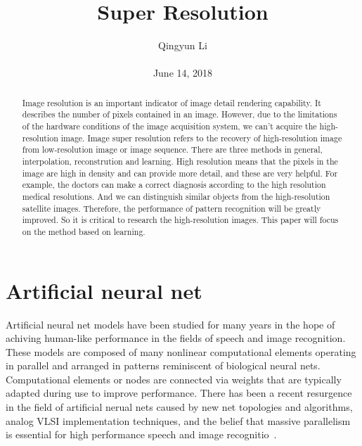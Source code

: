 \documentclass[10pt,twocolumn,letterpaper]{article}
\begin{document}
\author{Qingyun Li\\\\
June 14, 2018}        
\title{Super Resolution}

\maketitle

\begin{abstract}
 \par
  Image resolution is an important indicator of image detail rendering capability. It describes the number of pixels contained in an image. However, due to the limitations of the hardware conditions of the image acquisition system, we can't acquire the high-resolution image. Image super resolution refers to the recovery of high-resolution image from low-resolution image or image sequence. There are three methods in general, interpolation, reconstrution and learning.  High resolution means that the pixels in the image are high in density and can provide more detail, and these are very helpful. For example, the doctors can make a correct diagnosis according to the high resolution medical resolutions. And we can distinguish similar objects from the high-resolution satellite images. Therefore, the performance of pattern recognition will be greatly improved. So it is critical to research the high-resolution images. This paper will focus on the method based on learning.
\end{abstract}
\section{Artificial neural net}
 \par Artificial neural net models have been studied for many years in the hope of achiving human-like performance in the fields of speech and image recognition. These models are composed of many nonlinear computational elements operating in parallel and arranged in patterns reminiscent of biological neural nets. Computational elements or nodes are connected via weights that are typically adapted during use to improve performance. There has been a recent resurgence in the field of artificial nerual nets caused by new net topologies and algorithms, analog VLSI implementation techniques, and the belief that massive parallelism is essential for high performance speech and image recognitio~\cite{lippmann1987introduction}.
\end{document}

